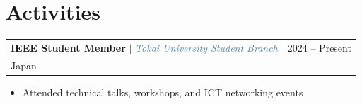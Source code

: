 \documentclass[9.5pt, a4paper]{article}
\makeatletter
\newcommand{\expheading}[4]{%
  \vspace{1.5pt}
  \begin{tabularx}{\linewidth}{@{}Xr@{}}
    \small\textbf{\color{darkgray}#1} $|$ \small\textcolor{steelblue}{\textit{#2}} & \textcolor{medgray}{\small #4}\\
    \textcolor{medgray}{\small #3} & \\
  \end{tabularx}
  \vspace{-1.5pt}
}
\newenvironment{bulletlist}{%
  \begin{itemize}[leftmargin=1.1em, itemsep=0.2pt, topsep=0.5pt, parsep=0pt]
  \small\color{darkgray}
}{%
  \end{itemize}\vspace{1.5pt}
}
\makeatother
\begin{document}
\begin{minipage}[t]{0.69\linewidth}
\section{Activities}

\expheading{IEEE Student Member}{Tokai University Student Branch}{Japan}{2024 -- Present}
\begin{bulletlist}
  \item Attended technical talks, workshops, and ICT networking events
\end{bulletlist}

\end{minipage}
\end{document}
